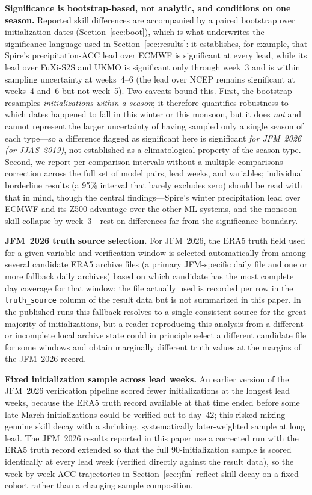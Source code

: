 \documentclass[11pt,a4paper]{article}
\begin{document}
\textbf{Significance is bootstrap-based, not analytic, and conditions on one
season.} Reported skill differences are accompanied by a paired
bootstrap over initialization dates (Section~\ref{sec:boot}), which is what
underwrites the significance language used in Section~\ref{sec:results}: it
establishes, for example, that Spire's precipitation-ACC lead over ECMWF is
significant at every lead, while its lead over FuXi-S2S and UKMO is
significant only through week~3 and is within sampling uncertainty at
weeks~4--6 (the lead over NCEP remains significant at weeks~4 and~6 but not
week~5). Two caveats bound this. First, the bootstrap resamples
\emph{initializations within a season}; it therefore quantifies robustness to
which dates happened to fall in this winter or this monsoon, but it does
\emph{not} and cannot represent the larger uncertainty of having sampled only a
single season of each type---so a difference flagged as significant here is
significant \emph{for JFM~2026 (or JJAS~2019)}, not established as a
climatological property of the season type. Second, we report per-comparison
intervals without a multiple-comparisons correction across the full set of
model pairs, lead weeks, and variables; individual borderline results
(a 95\% interval that barely excludes zero) should be read with that in mind,
though the central findings---Spire's winter precipitation lead over ECMWF and
its Z500 advantage over the other ML systems, and the monsoon skill collapse by
week~3---rest on differences far from the significance boundary.

\textbf{JFM~2026 truth source selection.} For JFM~2026, the ERA5 truth field
used for a given variable and verification window is selected automatically
from among several candidate ERA5 archive files (a primary JFM-specific daily
file and one or more fallback daily archives) based on which candidate has
the most complete day coverage for that window; the file actually used is
recorded per row in the \texttt{truth\_source} column of the result data but
is not summarized in this paper. In the published runs this fallback
resolves to a single consistent source for the great majority of
initializations, but a reader reproducing this analysis from a different or
incomplete local archive state could in principle select a different
candidate file for some windows and obtain marginally different truth values
at the margins of the JFM~2026 record.

\textbf{Fixed initialization sample across lead weeks.} An earlier version of
the JFM~2026 verification pipeline scored fewer initializations at the
longest lead weeks, because the ERA5 truth record available at that time
ended before some late-March initializations could be verified out to
day~42; this risked mixing genuine skill decay with a shrinking, systematically
later-weighted sample at long lead. The JFM~2026 results reported in this
paper use a corrected run with the ERA5 truth record extended so that the
full 90-initialization sample is scored identically at every lead week
(verified directly against the result data), so the week-by-week ACC
trajectories in Section~\ref{sec:jfm} reflect skill decay on a fixed cohort
rather than a changing sample composition.
\end{document}
